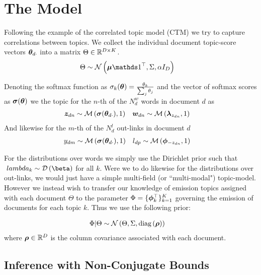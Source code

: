 

\newcommand \thdo { { \vv{\theta}_{d\cdot} } }
\newcommand \thok { { \vv{\theta}_{\cdot k} } }
\newcommand \phok { { \vv{\phi}_{\cdot k} } }
\newcommand \phdo { { \vv{\phi}_{d\cdot} } }


\section{The Model}
Following the example of the correlated topic model (CTM)\cite{Blei2006} we try to capture correlations between topics. We collect the individual document topic-score vectors $\thdo$ into a matrix $\Theta \in { \mathbb{R}^{D \times K} }$. 
\begin{align}
\Theta &\sim \mnor{\vv{\mu}\one\T}{\Sigma}{\alpha I_D}
\end{align}

Denoting the softmax function as $\sigma_k(\bm \theta) = \frac{\theta_k}{\sum_j \theta_j}$ and the vector of softmax scores as $\bm \sigma(\bm \theta)$ we 
the topic for the $n$-th of the $N^w_d$ words in document $d$ as
\begin{align}
\zdn & \sim \muln{\vv{\sigma}(\thdo)}{1} &
\wdn & \sim \muln{\vv{\lambda}_{z_{dn}}}{1}
\end{align}
And likewise for the $m$-th of the $N^l_d$ out-links in document $d$
\begin{align}
y_{dm} & \sim \muln{\vv{\sigma}(\thdo)}{1} &
l_{dp} & \sim \muln{\vv{\phi}_{- z_{dn}}}{1}
\end{align}

For the distributions over words we simply use the Dirichlet prior such that $\vv{\ lambda}_k \sim \dir{\vv{\beta}}$ for all $k$. Were we to do likewise for the distributions over out-links, we would just have a simple multi-field (or ``multi-modal") topic-model\cite{Salomatin2009}. However we instead wish to transfer our knowledge of emission topics assigned with each document $\Theta$ to the parameter $\Phi = \{ \bm \phi_k^\top \}_{k=1}^K$ governing the emission of documents for each topic $k$. Thus we use the following prior:

\begin{align}
\Phi|\Theta & \sim \mathcal{N} \left(\Theta, \Sigma, \text{diag} \left( {\bm \rho} \right)\right)
\end{align}
where $\bm \rho \in { \mathbb{R}^{D} }$ is the column covariance associated with each document. 

\subsection{Inference with Non-Conjugate Bounds}
